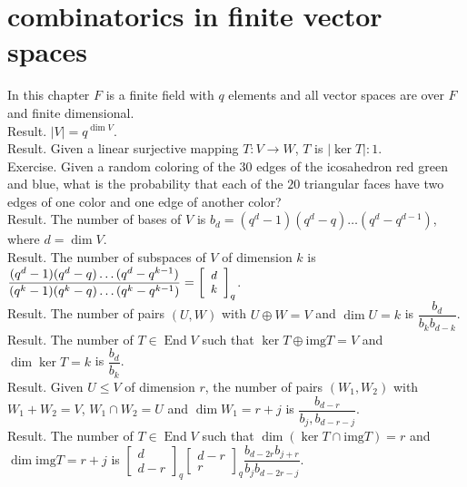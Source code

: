 \documentclass[english]{article}
\renewcommand\to{\longrightarrow}
\def\img{\text{img}}
\newcommand\abs[1]{\left|#1\right|}
\DeclareMathOperator\End{End}
\begin{document}
\section*{combinatorics in finite vector spaces}
In this chapter $F$ is a finite field with $q$ elements and all vector spaces are over $F$ and finite dimensional.\\


Result. $\abs{V}=q^{\dim V}$.\\


Result. Given a linear surjective mapping $T:V\to W$, $T$ is $\abs{\ker T}:1$.\\


Exercise. Given a random coloring of the $30$ edges of the icosahedron red green and blue, what is the probability that each of the $20$ triangular faces have two edges of one color and one edge of another color?\\


Result. The number of bases of $V$ is $b_d=(q^d-1)(q^d-q)\dots (q^d-q^{d-1})$, where $d=\dim V$.\\


Result. The number of subspaces of $V$ of dimension $k$ is $\dfrac{(q^d-1)(q^d-q)\dots (q^d-q^{k-1})}{(q^k-1)(q^k-q)\dots (q^k-q^{k-1})}=\small{\left[\begin{array}{c}
d\\
k
\end{array}\right]}_{q}$.\\


Result. The number of pairs $(U,W)$ with $U\oplus W=V$ and $\dim U=k$ is $\dfrac{b_d}{b_k b_{d-k}}$.\\


Result. The number of $T\in\End V$ such that $\ker T\oplus \img T =V$ and $\dim\ker T=k$ is $\dfrac{b_d}{b_k}$.\\


Result. Given $U\le V$ of dimension $r$, the number of pairs $(W_1,W_2)$ with $W_1\plus W_2=V$, $W_1\cap W_2=U$ and $\dim W_1=r+j$ is $\dfrac{b_{d-r}}{b_j, b_{d-r-j}}$.\\


Result. The number of $T\in\End V$ such that $\dim (\ker T\cap \img T)=r$ and $\dim \img T=r+j$ is $\left[\begin{array}{c}
d\\
d-r
\end{array}\right]_{q}\left[\begin{array}{c}
d-r\\
r
\end{array}\right]_{q}\dfrac{b_{d-2r}b_{j+r}}{b_{j}b_{d-2r-j}}$.\\
\end{document}
